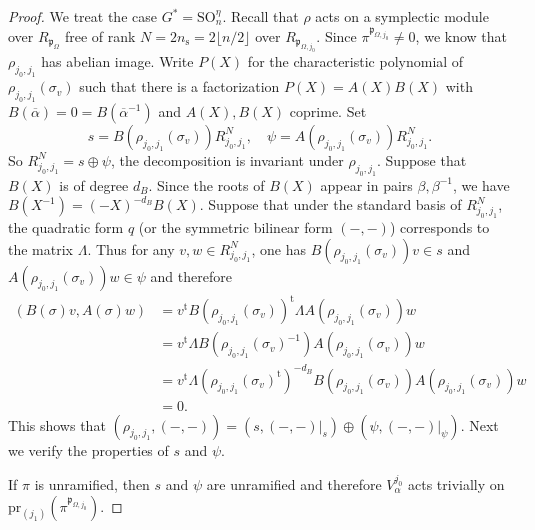 \documentclass[12pt,oneside,reqno]{amsart}
\theoremstyle{plain}
\begin{document}
	\begin{proof}
		We treat the case $G^\ast=\mathrm{SO}_n^\eta$.
		Recall that
		$\rho$
		acts on a symplectic module over $R_{\mathfrak{p}_\Omega}$ free of rank
		$N=2n_{\mathrm{s}}=2\lfloor n/2\rfloor$
		over
		$R_{\mathfrak{p}_{\Omega,j_0}}$.
		Since
		$\pi^{\mathfrak{p}_{\Omega,j_0}}
		\ne0$,
		we know that
		$\rho_{j_0,j_1}$
		has abelian image.
		Write
		$P(X)$
		for the characteristic polynomial of
		$\rho_{j_0,j_1}(\sigma_v)$
		such that there is a factorization
		$P(X)=A(X)B(X)$
		with
		$B(\overline{\alpha})=0=B(\overline{\alpha}^{-1})$
		and
		$A(X),B(X)$
		coprime.
		Set
		\[
		s=
		B(\rho_{j_0,j_1}(\sigma_v))
		R_{j_0,j_1}^N,
		\quad
		\psi
		=
		A(\rho_{j_0,j_1}(\sigma_v))R_{j_0,j_1}^N.
		\]
		So
		$R_{j_0,j_1}^N
		=
		s\oplus\psi$,
		the decomposition
		is
		invariant under
		$\rho_{j_0,j_1}$.
		Suppose that
		$B(X)$
		is of degree
		$d_B$.
		Since the roots of
		$B(X)$
		appear in pairs
		$\beta,\beta^{-1}$,
		we have
		$B(X^{-1})=(-X)^{-d_B}B(X)$.
		Suppose that under the standard basis of
		$R_{j_0,j_1}^N$,
		the quadratic form
		$q$
		(or the symmetric bilinear form
		$(-,-)$)
		corresponds to the matrix
		$\Lambda$.
		Thus for any
		$v,w\in R_{j_0,j_1}^N$,
		one has
		$B(\rho_{j_0,j_1}(\sigma_v))v\in s$
		and
		$A(\rho_{j_0,j_1}(\sigma_v))w\in\psi$
		and therefore
		\begin{align*}
			(B(\sigma)v,A(\sigma)w)
			&
			=
			v^\mathrm{t}
			B(\rho_{j_0,j_1}(\sigma_v))^\mathrm{t}
			\Lambda
			A(\rho_{j_0,j_1}(\sigma_v))
			w
			\\
			&
			=
			v^\mathrm{t}
			\Lambda
			B(\rho_{j_0,j_1}(\sigma_v)^{-1})
			A(\rho_{j_0,j_1}(\sigma_v))
			w
			\\
			&
			=
			v^\mathrm{t}
			\Lambda
			(\rho_{j_0,j_1}(\sigma_v)^\mathrm{t})^{-d_B}
			B(\rho_{j_0,j_1}(\sigma_v))
			A(\rho_{j_0,j_1}(\sigma_v))
			w
			\\
			&
			=
			0.
		\end{align*}
		This shows that
		$(\rho_{j_0,j_1},(-,-))
		=
		(s,(-,-)|_s)\oplus(\psi,(-,-)|_\psi)$.
		Next we verify the properties of
		$s$ and $\psi$.
		
		
		If $\pi$ is unramified,
		then
		$s$ and $\psi$ are unramified
		and therefore
		$V^{j_0}_\alpha$
		acts trivially on
		$\mathrm{pr}_{(j_1)}
		(\pi^{\mathfrak{p}_{\Omega,j_0}})$.
		

\end{proof}
\end{document}
